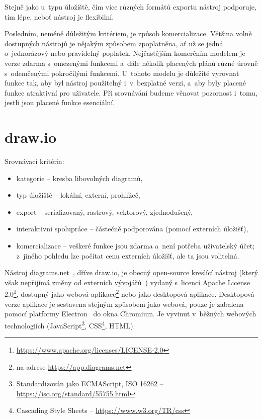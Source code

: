 Stejně jako u~typu úložiště, čím více různých formátů exportu nástroj podporuje, tím lépe, neboť nástroj je flexibilní.

Posledním, neméně důležitým kritériem, je způsob komercializace.
Většina volně dostupných nástrojů je nějakým způsobem zpoplatněna, ať už se jedná o~jednorázový nebo pravidelný poplatek.
Nejčastějším komerčním modelem je verze zdarma s~omezenými funkcemi a~dále několik placených plánů různé úrovně s~odemčenými pokročilými funkcemi.
U~tohoto modelu je důležité vyrovnat funkce tak, aby byl nástroj použitelný i~v~bezplatné verzi, a~aby byly placené funkce atraktivní pro uživatele.
Při srovnávání budeme věnovat pozornost i~tomu, jestli jsou placené funkce esenciální.

\section{draw.io}\label{section:drawio}

Srovnávací kritéria:
\begin{itemize}
  \item kategorie -- kresba libovolných diagramů,
  \item typ úložiště -- lokální, externí, prohlížeč,
  \item export -- serializovaný, rastrový, vektorový, zjednodušený,
  \item interaktivní spolupráce -- částečně podporována (pomocí externích úložišť),
  \item komercializace -- veškeré funkce jsou zdarma a~není potřeba uživatelský účet;
        z~jiného pohledu lze počítat cenu externích úložišť, ale ta jsou volitelná.
\end{itemize}

Nástroj diagrams.net~\cite{drawio_2023}, dříve draw.io, je obecný open-source kreslící nástroj
(který však nepřijímá změny od externích vývojářů~\cite{drawio_gh_2022}) %
vydaný s~licencí Apache License 2.0\footnote{\url{https://www.apache.org/licenses/LICENSE-2.0}}, dostupný jako webová aplikace\footnote{na adrese \url{https://app.diagrams.net}} nebo jako desktopová aplikace.
Desktopová verze aplikace je sestavena stejným způsobem jako webová, pouze je zabalena pomocí platformy Electron~\cite{openjsfoundation_electron_2023} do okna Chromium.
Je vyvinut v~běžných we\-bo\-vých tech\-no\-lo\-gi\-ích (Java\-Script\footnote{Standardizován jako ECMAScript, ISO 16262 -- \url{https://iso.org/standard/55755.html}}, CSS\footnote{Cascading Style Sheets -- \url{https://www.w3.org/TR/css}}, HTML).


